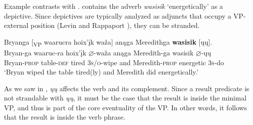 \documentclass[output=paper]{LSP/langsci}
\begin{document}
\begin{exe}
\ex
\begin{xlist}



\end{xlist}
\end{exe}

Example  contrasts with .   contains the adverb \emph{wasisik} `energetically' as a depictive. Since depictives are typically analyzed as adjuncts that occupy a VP-external position (Levin and Rappaport \citealt{Hovav1995}), they can be stranded.

\begin{exe}

\ex \glll Bryanga [\textsubscript{VP} waarucra hoix'įk waža\textsc] anąga  Meredithga \textbf{wasisik} [ųų]. \\
 Bryan-ga {} waaruc-ra hoix'įk {$\varnothing$}-waža anąga Meredith-ga  wasisik {$\varnothing$}-ųų\\
Bryan-\textsc{prop} {} table-\textsc{def} tired \textsc{3s/o}-wipe and Meredith-\textsc{prop}  energetic \textsc{3s}-do\\
\glt `Bryan wiped the table tired(ly) and Meredith did energetically.'

\end{exe}

As we saw in , \textit{ųų} affects the verb and its complement. Since a result predicate is not strandable with \textit{ųų}, it must be the case that the result is inside the minimal VP, and thus is part of the core eventuality of the VP. In other words, it follows that the result is inside the verb phrase.
\end{document}

